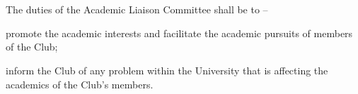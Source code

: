 \section{}
The duties of the Academic Liaison Committee shall be to –
	\begin{legal}
	\item promote the academic interests and facilitate the academic pursuits of members of the Club;
	\item inform the Club of any problem within the University that is affecting the academics of the Club's members.
	\end{legal}
